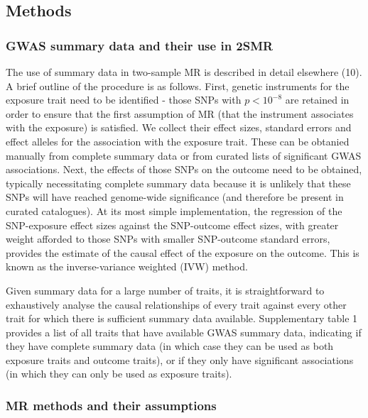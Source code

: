 \documentclass[]{article}
\begin{document}
\subsection{Methods}\label{methods}

\subsubsection{GWAS summary data and their use in
2SMR}\label{gwas-summary-data-and-their-use-in-2smr}

The use of summary data in two-sample MR is described in detail
elsewhere (10). A brief outline of the procedure is as follows. First,
genetic instruments for the exposure trait need to be identified - those
SNPs with \(p < 10^{-8}\) are retained in order to ensure that the first
assumption of MR (that the instrument associates with the exposure) is
satisfied. We collect their effect sizes, standard errors and effect
alleles for the association with the exposure trait. These can be
obtanied manually from complete summary data or from curated lists of
significant GWAS associations. Next, the effects of those SNPs on the
outcome need to be obtained, typically necessitating complete summary
data because it is unlikely that these SNPs will have reached
genome-wide significance (and therefore be present in curated
catalogues). At its most simple implementation, the regression of the
SNP-exposure effect sizes against the SNP-outcome effect sizes, with
greater weight afforded to those SNPs with smaller SNP-outcome standard
errors, provides the estimate of the causal effect of the exposure on
the outcome. This is known as the inverse-variance weighted (IVW)
method.

Given summary data for a large number of traits, it is straightforward
to exhaustively analyse the causal relationships of every trait against
every other trait for which there is sufficient summary data available.
Supplementary table 1 provides a list of all traits that have available
GWAS summary data, indicating if they have complete summary data (in
which case they can be used as both exposure traits and outcome traits),
or if they only have significant associations (in which they can only be
used as exposure traits).

\subsubsection{MR methods and their
assumptions}\label{mr-methods-and-their-assumptions}
\end{document}
